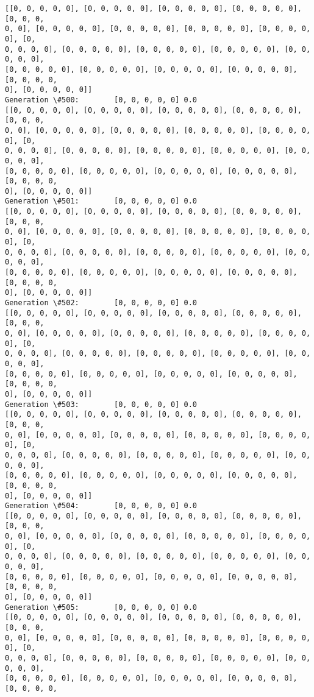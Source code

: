 \documentclass[11pt]{article}
\begin{document}
\begin{Verbatim}[commandchars=\\\{\}]
[[0, 0, 0, 0, 0], [0, 0, 0, 0, 0], [0, 0, 0, 0, 0], [0, 0, 0, 0, 0], [0, 0, 0,
0, 0], [0, 0, 0, 0, 0], [0, 0, 0, 0, 0], [0, 0, 0, 0, 0], [0, 0, 0, 0, 0], [0,
0, 0, 0, 0], [0, 0, 0, 0, 0], [0, 0, 0, 0, 0], [0, 0, 0, 0, 0], [0, 0, 0, 0, 0],
[0, 0, 0, 0, 0], [0, 0, 0, 0, 0], [0, 0, 0, 0, 0], [0, 0, 0, 0, 0], [0, 0, 0, 0,
0], [0, 0, 0, 0, 0]]
Generation \#500:        [0, 0, 0, 0, 0] 0.0
[[0, 0, 0, 0, 0], [0, 0, 0, 0, 0], [0, 0, 0, 0, 0], [0, 0, 0, 0, 0], [0, 0, 0,
0, 0], [0, 0, 0, 0, 0], [0, 0, 0, 0, 0], [0, 0, 0, 0, 0], [0, 0, 0, 0, 0], [0,
0, 0, 0, 0], [0, 0, 0, 0, 0], [0, 0, 0, 0, 0], [0, 0, 0, 0, 0], [0, 0, 0, 0, 0],
[0, 0, 0, 0, 0], [0, 0, 0, 0, 0], [0, 0, 0, 0, 0], [0, 0, 0, 0, 0], [0, 0, 0, 0,
0], [0, 0, 0, 0, 0]]
Generation \#501:        [0, 0, 0, 0, 0] 0.0
[[0, 0, 0, 0, 0], [0, 0, 0, 0, 0], [0, 0, 0, 0, 0], [0, 0, 0, 0, 0], [0, 0, 0,
0, 0], [0, 0, 0, 0, 0], [0, 0, 0, 0, 0], [0, 0, 0, 0, 0], [0, 0, 0, 0, 0], [0,
0, 0, 0, 0], [0, 0, 0, 0, 0], [0, 0, 0, 0, 0], [0, 0, 0, 0, 0], [0, 0, 0, 0, 0],
[0, 0, 0, 0, 0], [0, 0, 0, 0, 0], [0, 0, 0, 0, 0], [0, 0, 0, 0, 0], [0, 0, 0, 0,
0], [0, 0, 0, 0, 0]]
Generation \#502:        [0, 0, 0, 0, 0] 0.0
[[0, 0, 0, 0, 0], [0, 0, 0, 0, 0], [0, 0, 0, 0, 0], [0, 0, 0, 0, 0], [0, 0, 0,
0, 0], [0, 0, 0, 0, 0], [0, 0, 0, 0, 0], [0, 0, 0, 0, 0], [0, 0, 0, 0, 0], [0,
0, 0, 0, 0], [0, 0, 0, 0, 0], [0, 0, 0, 0, 0], [0, 0, 0, 0, 0], [0, 0, 0, 0, 0],
[0, 0, 0, 0, 0], [0, 0, 0, 0, 0], [0, 0, 0, 0, 0], [0, 0, 0, 0, 0], [0, 0, 0, 0,
0], [0, 0, 0, 0, 0]]
Generation \#503:        [0, 0, 0, 0, 0] 0.0
[[0, 0, 0, 0, 0], [0, 0, 0, 0, 0], [0, 0, 0, 0, 0], [0, 0, 0, 0, 0], [0, 0, 0,
0, 0], [0, 0, 0, 0, 0], [0, 0, 0, 0, 0], [0, 0, 0, 0, 0], [0, 0, 0, 0, 0], [0,
0, 0, 0, 0], [0, 0, 0, 0, 0], [0, 0, 0, 0, 0], [0, 0, 0, 0, 0], [0, 0, 0, 0, 0],
[0, 0, 0, 0, 0], [0, 0, 0, 0, 0], [0, 0, 0, 0, 0], [0, 0, 0, 0, 0], [0, 0, 0, 0,
0], [0, 0, 0, 0, 0]]
Generation \#504:        [0, 0, 0, 0, 0] 0.0
[[0, 0, 0, 0, 0], [0, 0, 0, 0, 0], [0, 0, 0, 0, 0], [0, 0, 0, 0, 0], [0, 0, 0,
0, 0], [0, 0, 0, 0, 0], [0, 0, 0, 0, 0], [0, 0, 0, 0, 0], [0, 0, 0, 0, 0], [0,
0, 0, 0, 0], [0, 0, 0, 0, 0], [0, 0, 0, 0, 0], [0, 0, 0, 0, 0], [0, 0, 0, 0, 0],
[0, 0, 0, 0, 0], [0, 0, 0, 0, 0], [0, 0, 0, 0, 0], [0, 0, 0, 0, 0], [0, 0, 0, 0,
0], [0, 0, 0, 0, 0]]
Generation \#505:        [0, 0, 0, 0, 0] 0.0
[[0, 0, 0, 0, 0], [0, 0, 0, 0, 0], [0, 0, 0, 0, 0], [0, 0, 0, 0, 0], [0, 0, 0,
0, 0], [0, 0, 0, 0, 0], [0, 0, 0, 0, 0], [0, 0, 0, 0, 0], [0, 0, 0, 0, 0], [0,
0, 0, 0, 0], [0, 0, 0, 0, 0], [0, 0, 0, 0, 0], [0, 0, 0, 0, 0], [0, 0, 0, 0, 0],
[0, 0, 0, 0, 0], [0, 0, 0, 0, 0], [0, 0, 0, 0, 0], [0, 0, 0, 0, 0], [0, 0, 0, 0,

\end{Verbatim}
\end{document}
